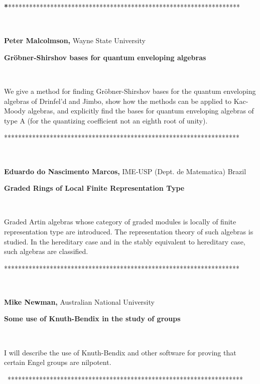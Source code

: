 \documentclass[12pt]{article}
\begin{document}
\begin{center}
\textbf{*}******************************************************************
\end{center}

\vspace{.1in}\ 

\noindent \textbf{Peter Malcolmson, }Wayne State University

\noindent \textbf{Gr\"{o}bner-Shirshov bases for quantum enveloping algebras}

\smallskip\ 

\noindent We give a method for finding Gr\"{o}bner-Shirshov bases for the
quantum enveloping algebras of Drinfel'd and Jimbo, show how the methods can
be applied to Kac-Moody algebras, and explicitly find the bases for quantum
enveloping algebras of type A (for the quantizing coefficient not an eighth
root of unity).

\begin{center}
*******************************************************************
\end{center}

\newpage\ 

\noindent \textbf{Eduardo do Nascimento Marcos, }IME-USP (Dept. de
Matematica) Brazil

\noindent \textbf{Graded Rings of Local Finite Representation Type}

\smallskip\ 

\noindent Graded Artin algebras whose category of graded modules is locally
of finite representation type are introduced. The representation theory of
such algebras is studied. In the hereditary case and in the stably
equivalent to hereditary case, such algebras are classified.

\begin{center}
*******************************************************************
\end{center}

\smallskip\ 

\noindent \textbf{Mike Newman,} Australian National University

\noindent \textbf{Some use of Knuth-Bendix in the study of groups}

\smallskip\ 

\noindent I will describe the use of Knuth-Bendix and other software for
proving that certain Engel groups are nilpotent.

\begin{center}
\ *******************************************************************
\end{center}
\end{document}
